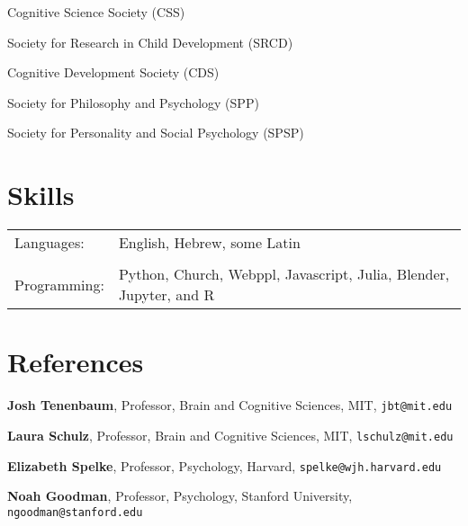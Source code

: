 \documentclass[margin,line,pifont,palatino,courier]{res}
\begin{document}
\begin{resume}
Cognitive Science Society (CSS)

Society for Research in Child Development (SRCD)

Cognitive Development Society (CDS)

Society for Philosophy and Psychology (SPP)

Society for Personality and Social Psychology (SPSP)

\section{\sc Skills}

\begin{tabular}{@{}p{0.8in}p{6in}}

Languages:& English, Hebrew, some Latin\\
\\
Programming:& Python, Church, Webppl, Javascript, Julia, Blender, Jupyter, and R \\

\end{tabular}


\section{\sc References}

{\bf Josh Tenenbaum}, Professor,
Brain and Cognitive Sciences, MIT,
 \texttt{jbt@mit.edu}

{\bf Laura Schulz}, Professor,
Brain and Cognitive Sciences, MIT,
 \texttt{lschulz@mit.edu}

{\bf Elizabeth Spelke}, Professor,
Psychology, Harvard,
\texttt{spelke@wjh.harvard.edu}

{\bf Noah Goodman}, Professor,
Psychology, Stanford University,
 \texttt{ngoodman@stanford.edu}\\

\end{resume}
\end{document}
